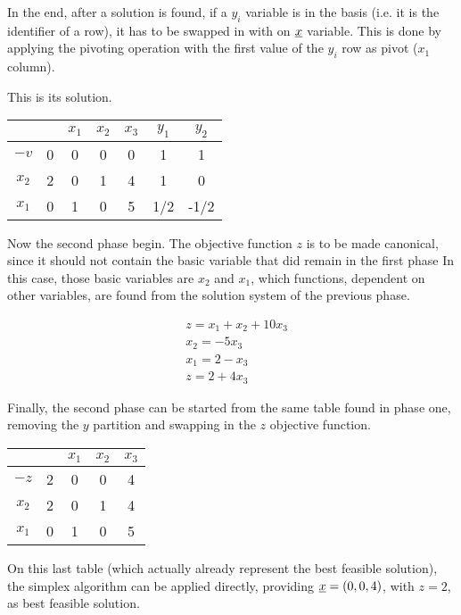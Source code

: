 In the end, after a solution is found, if a $y_i$ variable is in the basis (i.e. it is the identifier of a row), it has to be swapped in with on $\underline{x}$ variable.
This is done by applying the pivoting operation with the first value of the $y_i$ row as pivot ($x_1$ column).

This is its solution.

\begin{center}
    \begin{tabular}{c|c|ccc|cc}
        & & $x_1$ & $x_2$ & $x_3$ & $y_1$ & $y_2$ \\ \hline
        $-v$ & 0 & 0 & 0 & 0 & 1 & 1 \\ \hline
        $x_2$ & 2 & 0 & 1 & 4 & 1 & 0 \\
        $x_1$ & 0 & 1 & 0 & 5 & 1/2 & -1/2
    \end{tabular}
\end{center}

Now the second phase begin.
The objective function $z$ is to be made canonical, since it should not contain the basic variable that did remain in the first phase
In this case, those basic variables are $x_2$ and $x_1$, which functions, dependent on other variables, are found from the solution system of the previous phase.

\begin{align*}
& z = x_1 + x_2 + 10 x_3 \\
& x_2 = -5 x_3 \\
& x_1 = 2 - x_3 \\
& z = 2 + 4 x_3
\end{align*}

Finally, the second phase can be started from the same table found in phase one, removing the $y$ partition and swapping in the $z$ objective function.

\begin{center}
    \begin{tabular}{c|c|ccc}
        & & $x_1$ & $x_2$ & $x_3$ \\ \hline
        $-z$ & 2 & 0 & 0 & 4 \\ \hline
        $x_2$ & 2 & 0 & 1 & 4 \\
        $x_1$ & 0 & 1 & 0 & 5
    \end{tabular}
\end{center}

On this last table (which actually already represent the best feasible solution), the simplex algorithm can be applied directly, providing $\underline{x} = (0, 0, 4)$, with $z = 2$, as best feasible solution.

